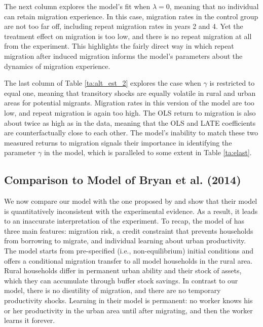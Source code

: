 \documentclass[12pt,pdftex]{article}
\begin{document}
The next column explores the model's fit when $\lambda = 0$, meaning that no individual can retain migration experience. In this case, migration rates in the control group are not too far off, including repeat migration rates in years 2 and 4. Yet the treatment effect on migration is too low, and there is no repeat migration at all from the experiment. This highlights the fairly direct way in which repeat migration after induced migration informs the model's parameters about the dynamics of migration experience.

The last column of Table \ref{ta:alt_est_2} explores the case when $\gamma$ is restricted to equal one, meaning that transitory shocks are equally volatile in rural and urban areas for potential migrants. Migration rates in this version of the model are too low, and repeat migration is again too high. The OLS return to migration is also about twice as high as in the data, meaning that the OLS and LATE coefficients are counterfactually close to each other. The model's inability to match these two measured returns to migration signals their importance in identifying the parameter $\gamma$ in the model, which is paralleled to some extent in Table \ref{ta:elast}.



\subsection{Comparison to Model of Bryan et al. (2014) \label{sec:bcm_lmw}}

We now compare our model with the one proposed by \citet{brch14} and show that their model is quantitatively inconsistent with the experimental evidence. As a result, it leads to an inaccurate interpretation of the experiment. To recap, the model of \citet{brch14} has three main features: migration risk, a credit constraint that prevents households from borrowing to migrate, and individual learning about urban productivity. The model starts from pre-specified (i.e., non-equilibrium) initial conditions and offers a conditional migration transfer to all model households in the rural area. Rural households differ in permanent urban ability and their stock of assets, which they can accumulate through buffer stock savings. In contrast to our model, there is no disutility of migration, and there are no temporary productivity shocks. Learning in their model is permanent: no worker knows his or her productivity in the urban area until after migrating, and then the worker learns it forever.
\end{document}

